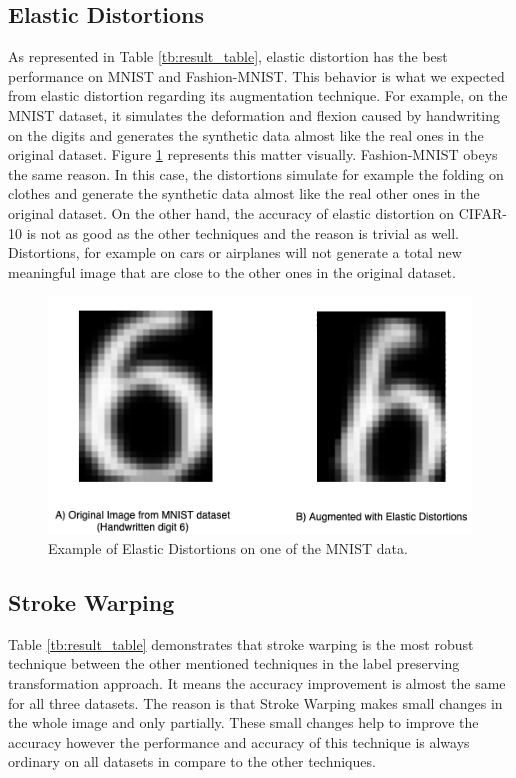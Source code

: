 \subsection{Elastic Distortions}
As represented in Table \ref{tb:result_table}, elastic distortion has the best performance on
MNIST and Fashion-MNIST. This behavior is what we expected from elastic distortion regarding its
augmentation technique. For example, on the MNIST dataset, it simulates the deformation and flexion
caused by handwriting on the digits and generates the synthetic data almost like the real ones in
the original dataset. Figure \ref{fig:Elastic_Distortion_Example} represents this matter visually.
Fashion-MNIST obeys the same reason. In this case, the distortions simulate for example the folding
on clothes and generate the synthetic data almost like the real other ones in the original dataset.
On the other hand, the accuracy of elastic distortion on CIFAR-10 is not as good as the other
techniques and the reason is trivial as well. Distortions, for example on cars or airplanes will not
generate a total new meaningful image that are close to the other ones in the original
dataset.

\begin{figure}
  \centering
  \label{fig:Elastic_Distortion_Example}
  \includegraphics[width=1\textwidth]{fig/result/Elastic-Distortions-Example}
  \caption{Example of Elastic Distortions on one of the MNIST data.}
\end{figure}

\subsection{Stroke Warping}
Table \ref{tb:result_table} demonstrates that stroke warping is the most robust technique between
the other mentioned techniques in the label preserving transformation approach. It means the
accuracy improvement is almost the same for all three datasets. The reason is that Stroke Warping
makes small changes in the whole image and only partially. These small changes help to improve the
accuracy however the performance and accuracy of this technique is always ordinary on all datasets in compare to the
other techniques.



